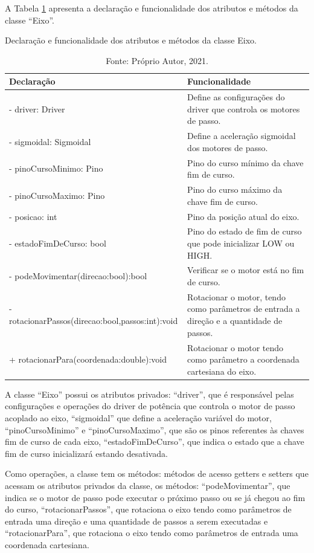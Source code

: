 A Tabela \ref{tab:classeeixo} apresenta a declaração e funcionalidade dos atributos e métodos da 
classe “Eixo”.

\begin{table}[!htb]
    \centering
    \caption{Declaração e funcionalidade dos atributos e métodos da classe Eixo.}
    \begin{tabular}{lp{6cm}}
        \hline
        \textbf{Declaração} & \textbf{Funcionalidade}\\
        \hline
        - driver: Driver & Define as configurações do driver que controla os motores de passo.\\
        - sigmoidal: Sigmoidal & Define a aceleração sigmoidal dos motores de passo.\\
        - pinoCursoMinimo: Pino & Pino do curso mínimo da chave fim de curso.\\
        - pinoCursoMaximo: Pino & Pino do curso máximo da chave fim de curso.\\
        - posicao: int & Pino da posição atual do eixo.\\
        - estadoFimDeCurso: bool & Pino do estado de fim de curso que pode inicializar LOW ou HIGH.\\
        - podeMovimentar(direcao:bool):bool & Verificar se o motor está no fim de curso.\\
        - rotacionarPassos(direcao:bool,passos:int):void & Rotacionar o motor, tendo como parâmetros de entrada a direção e a quantidade de passos.\\
        + rotacionarPara(coordenada:double):void & Rotacionar o motor tendo como parâmetro a coordenada cartesiana do eixo.\\
        \hline       
    \end{tabular}
    \caption*{Fonte: Próprio Autor, 2021.}
    \label{tab:classeeixo}
\end{table}

A classe “Eixo” possui os atributos privados: “driver”, que é responsável pelas configurações e operações 
do driver de potência que controla o motor de passo acoplado ao eixo, “sigmoidal” que define a aceleração 
variável do motor, “pinoCursoMinimo” e “pinoCursoMaximo”, que são os pinos referentes às chaves fim de 
curso de cada eixo, “estadoFimDeCurso”, que indica o estado que a chave fim de curso inicializará estando 
desativada. 

Como operações, a classe tem os métodos: métodos de acesso getters e setters que acessam os atributos 
privados da classe, os métodos: “podeMovimentar”, que indica se o motor de passo pode executar o próximo 
passo ou se já chegou ao fim do curso, “rotacionarPassos”, que rotaciona o eixo tendo como parâmetros de 
entrada uma direção e uma quantidade de passos a serem executadas e “rotacionarPara”, que rotaciona o 
eixo tendo como parâmetros de entrada uma coordenada cartesiana.

